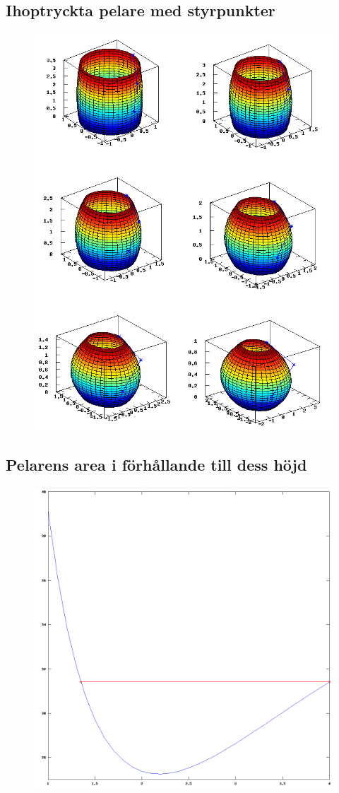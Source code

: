 \documentclass[a4paper,10pt]{article}
\begin{document}
	\subsection{Ihoptryckta pelare med styrpunkter}
	\begin{figure}[htp]
	\centering
	\includegraphics[width=320pt]{fig}
	\end{figure}

	\newpage
	\subsection{Pelarens area i förhållande till dess höjd}
	\begin{figure}[htp]
	\centering
	\includegraphics[width=320pt]{fig3}
	\end{figure}
\end{document}
